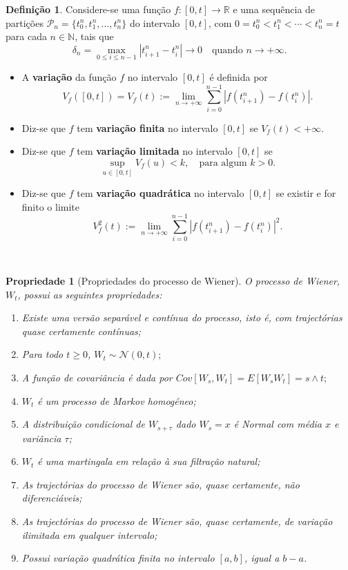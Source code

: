 \documentclass[
  11pt,
  a4paper,
]{book}
\newtheorem{proposition}{Propriedade}[chapter]
\theoremstyle{definition}
\newtheorem{definition}{Definição}[chapter]
\theoremstyle{definition}
\theoremstyle{definition}
\theoremstyle{definition}
\theoremstyle{remark}
\begin{document}
\begin{definition}

Considere-se uma função \(f:[0,t] \rightarrow \mathbb{R}\) e uma sequência de partições \(\mathcal{P}_n = \{t_0^n, t_1^n, \ldots, t_n^n\}\) do intervalo \([0,t]\), com \(0 = t_0^n < t_1^n < \cdots < t_n^n = t\) para cada \(n \in \mathbb{N}\), tais que
\[
\delta_n = \max_{0 \leq i \leq n-1} |t_{i+1}^n - t_i^n| \to 0 \quad \text{quando } n \to +\infty.
\]

\begin{itemize}
\item
  A \textbf{variação} da função \(f\) no intervalo \([0,t]\) é definida por
  \[
  V_f([0,t]) = V_f(t) := \lim_{n \to +\infty} \sum_{i=0}^{n-1} |f(t_{i+1}^n) - f(t_i^n)|.
  \]
\item
  Diz-se que \(f\) tem \textbf{variação finita} no intervalo \([0,t]\) se \(V_f(t) < +\infty\).
\item
  Diz-se que \(f\) tem \textbf{variação limitada} no intervalo \([0,t]\) se
  \[
  \sup_{u \in [0,t]} V_f(u) < k, \quad \text{para algum } k > 0.
  \]
\item
  Diz-se que \(f\) tem \textbf{variação quadrática} no intervalo \([0,t]\) se existir e for finito o limite
  \[
  V_f^2(t) := \lim_{n \to +\infty} \sum_{i=0}^{n-1} |f(t_{i+1}^n) - f(t_i^n)|^2.
  \]
\end{itemize}

\end{definition}

\(\,\)

\begin{proposition}[Propriedades do processo de Wiener]

O processo de Wiener, \(W_t\), possui as seguintes propriedades:

\begin{enumerate}
\def\labelenumi{\arabic{enumi}.}
\item
  Existe uma versão separável e contínua do processo, isto é, com trajectórias quase certamente contínuas;
\item
  Para todo \(t \geq 0\), \(W_t \sim \mathcal{N}(0,t);\)
\item
  A função de covariância é dada por \(Cov[W_s, W_t] = E[W_s W_t] = s \wedge t;\)
\item
  \(W_t\) é um processo de Markov homogéneo;
\item
  A distribuição condicional de \(W_{s+\tau}\) dado \(W_s = x\) é Normal com média \(x\) e variância \(\tau\);
\item
  \(W_t\) é uma martingala em relação à sua filtração natural;
\item
  As trajectórias do processo de Wiener são, quase certamente, não diferenciáveis;
\item
  As trajectórias do processo de Wiener são, quase certamente, de variação ilimitada em qualquer intervalo;
\item
  Possui variação quadrática finita no intervalo \([a,b]\), igual a \(b-a\).
\end{enumerate}

\end{proposition}
\end{document}
